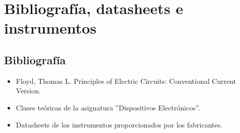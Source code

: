 \section{Bibliografía, datasheets e instrumentos}
\subsection{Bibliografía}
\begin{itemize}[nosep]
    \item Floyd, Thomas L. Principles of Electric Circuits: Conventional Current Version.
    \item Clases teóricas de la asignatura ''Dispositivos Electrónicos''.
    \item Datasheets de los instrumentos proporcionados por los fabricantes.
\end{itemize}\newpage

